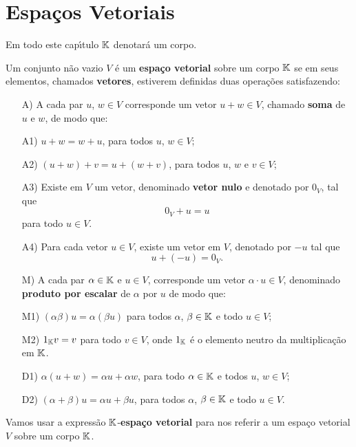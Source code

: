 \chapter{Espa\c{c}os Vetoriais}

Em todo este cap{\'\i}tulo $\mathbb{K}$ denotar\'a um corpo.

\begin{definicao}
	Um conjunto	n\~ao vazio $V$ \'e um \textbf{espa\c{c}o vetorial} sobre um corpo $\mathbb{K}$ se em seus elementos, chamados \textbf{vetores}, estiverem definidas duas opera\c{c}\~oes satisfazendo:
	\begin{itemize}
		\item[A)] A cada par $u$, $w \in V$ corresponde um vetor $u + w \in V$, chamado \textbf{soma} de $u$ e $w$, de modo que:
		\item[A1)] $u + w = w + u$, para todos $u$, $w \in V$;
		\item[A2)] $(u + w) + v = u + (w + v)$, para todos $u$, $w$ e $v \in V$;
		\item[A3)] Existe em $V$ um vetor, denominado \textbf{vetor nulo} e denotado por $0_V$, tal que
		\[
			0_V + u = u
		\]
		para todo $u \in V$.
		\item[A4)] Para cada vetor $u \in V$, existe um vetor em $V$, denotado por $-u$ tal que
		\[
			u + (-u) = 0_V.
		\]
		\item[M)] A cada par $\alpha \in \mathbb{K}$ e $u \in V$, corresponde um vetor $\alpha \cdot u \in V$, denominado \textbf{produto por escalar} de $\alpha$ por $u$ de modo que:
		\item[M1)] $(\alpha\beta)u = \alpha(\beta u)$ para todos $\alpha$, $\beta \in \mathbb{K}$ e todo $u \in V$;
		\item[M2)] $1_{\mathbb{K}} v = v$ para todo $v \in V$, onde $1_{\mathbb{K}}$ \'e o elemento neutro da multiplica\c{c}\~ao em $\mathbb{K}$.
		\item[D1)] $\alpha(u + w) = \alpha u + \alpha w$, para todo $\alpha \in \mathbb{K}$ e todos $u$, $w \in V$;
		\item[D2)] $(\alpha + \beta)u = \alpha u + \beta u$, para todos $\alpha$, $\beta \in \mathbb{K}$ e todo $u \in V$.
	\end{itemize}
\end{definicao}

\begin{observacao}
	Vamos usar a express\~ao $\mathbb{K}$-\textbf{espa\c{c}o vetorial} para nos referir a um espa\c{c}o vetorial $V$ sobre um corpo $\mathbb{K}$.
\end{observacao}

